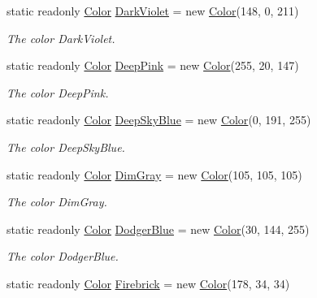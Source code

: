 \begin{DoxyCompactItemize}
static readonly \hyperlink{struct_tri_devs_1_1_tri_engine2_d_1_1_color}{Color} \hyperlink{struct_tri_devs_1_1_tri_engine2_d_1_1_color_adc1bf5d5f4bf38c0d47e94793ceb102f}{Dark\-Violet} = new \hyperlink{struct_tri_devs_1_1_tri_engine2_d_1_1_color}{Color}(148, 0, 211)
\begin{DoxyCompactList}\small\item\em The color Dark\-Violet. \end{DoxyCompactList}\item 
static readonly \hyperlink{struct_tri_devs_1_1_tri_engine2_d_1_1_color}{Color} \hyperlink{struct_tri_devs_1_1_tri_engine2_d_1_1_color_af145cae7380f9f0362104685127ef3a4}{Deep\-Pink} = new \hyperlink{struct_tri_devs_1_1_tri_engine2_d_1_1_color}{Color}(255, 20, 147)
\begin{DoxyCompactList}\small\item\em The color Deep\-Pink. \end{DoxyCompactList}\item 
static readonly \hyperlink{struct_tri_devs_1_1_tri_engine2_d_1_1_color}{Color} \hyperlink{struct_tri_devs_1_1_tri_engine2_d_1_1_color_aadea9ea0dce4b3267aa65f7c0ce1e1a1}{Deep\-Sky\-Blue} = new \hyperlink{struct_tri_devs_1_1_tri_engine2_d_1_1_color}{Color}(0, 191, 255)
\begin{DoxyCompactList}\small\item\em The color Deep\-Sky\-Blue. \end{DoxyCompactList}\item 
static readonly \hyperlink{struct_tri_devs_1_1_tri_engine2_d_1_1_color}{Color} \hyperlink{struct_tri_devs_1_1_tri_engine2_d_1_1_color_ab33b472ebad9602c52c0a4b87f04ff10}{Dim\-Gray} = new \hyperlink{struct_tri_devs_1_1_tri_engine2_d_1_1_color}{Color}(105, 105, 105)
\begin{DoxyCompactList}\small\item\em The color Dim\-Gray. \end{DoxyCompactList}\item 
static readonly \hyperlink{struct_tri_devs_1_1_tri_engine2_d_1_1_color}{Color} \hyperlink{struct_tri_devs_1_1_tri_engine2_d_1_1_color_a7dfbb09ef53b56b3500adabd1e7cb051}{Dodger\-Blue} = new \hyperlink{struct_tri_devs_1_1_tri_engine2_d_1_1_color}{Color}(30, 144, 255)
\begin{DoxyCompactList}\small\item\em The color Dodger\-Blue. \end{DoxyCompactList}\item 
static readonly \hyperlink{struct_tri_devs_1_1_tri_engine2_d_1_1_color}{Color} \hyperlink{struct_tri_devs_1_1_tri_engine2_d_1_1_color_a119b65cf9ddbada206b89376bf2bd5e7}{Firebrick} = new \hyperlink{struct_tri_devs_1_1_tri_engine2_d_1_1_color}{Color}(178, 34, 34)

\end{DoxyCompactItemize}
